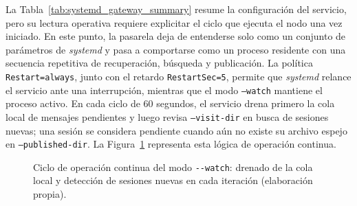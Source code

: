 La Tabla~\ref{tab:systemd_gateway_summary} resume la configuración del servicio, pero su lectura operativa requiere explicitar el ciclo que ejecuta el nodo una vez iniciado. En este punto, la pasarela deja de entenderse solo como un conjunto de parámetros de \textit{systemd} y pasa a comportarse como un proceso residente con una secuencia repetitiva de recuperación, búsqueda y publicación. La política \texttt{Restart=always}, junto con el retardo \texttt{RestartSec=5}, permite que \textit{systemd} relance el servicio ante una interrupción, mientras que el modo \texttt{--watch} mantiene el proceso activo. En cada ciclo de 60 segundos, el servicio drena primero la cola local de mensajes pendientes y luego revisa \texttt{--visit-dir} en busca de sesiones nuevas; una sesión se considera pendiente cuando aún no existe su archivo espejo en \texttt{--published-dir}. La Figura~\ref{fig:watch_cycle} representa esta lógica de operación continua.

\begin{figure}[H]
\centering
{}
\caption{Ciclo de operación continua del modo \texttt{-{}-watch}: drenado de la cola local y detección de sesiones nuevas en cada iteración (elaboración propia).}
\label{fig:watch_cycle}
\end{figure}

